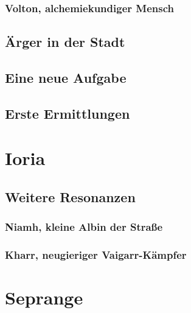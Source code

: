 \documentclass[a4paper]{scrreprt}
\begin{document}
\subsection{Volton, alchemiekundiger Mensch}

\section{Ärger in der Stadt}

\section{Eine neue Aufgabe}

\section{Erste Ermittlungen}


\chapter[17. Dezember 2016]{Ioria}

\section{Weitere Resonanzen}
\subsection{Niamh, kleine Albin der Straße}
\subsection{Kharr, neugieriger Vaigarr-Kämpfer}

\chapter[14. Januar 2017]{Seprange}
\end{document}

